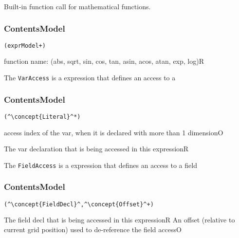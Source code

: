 Built-in function call for mathematical functions.


\subsubsection*{ContentsModel}{}
\begin{lstlisting}[style=default,frame=none]
(exprModel+)
\end{lstlisting}


\begin{HIRChildElements}
\end{HIRChildElements}

\begin{HIRAttributes}
	{function name: (abs, sqrt, sin, cos, tan, asin, acos, atan, exp, log)}{R}
\end{HIRAttributes}

The {\tt VarAccess} is a expression that defines an access to a 

\subsubsection*{ContentsModel}{}

\begin{lstlisting}[style=default,frame=none]
(^\concept{Literal}^*)
\end{lstlisting}

\begin{HIRChildElements}
	{access index of the var, when it is declared with more than 1 dimension}{O}
\end{HIRChildElements}

\begin{HIRAttributes}
	{The var declaration that is being accessed in this expression}{R}
\end{HIRAttributes}

The {\tt FieldAccess} is a expression that defines an access to a field

\subsubsection*{ContentsModel}{}

\begin{lstlisting}[style=default,frame=none]
(^\concept{FieldDecl}^,^\concept{Offset}^+)
\end{lstlisting}

\begin{HIRChildElements}
	{The field decl that is being accessed in this expression}{R}
	{An offset (relative to current grid position) used to de-reference the field access}{O}
\end{HIRChildElements}
